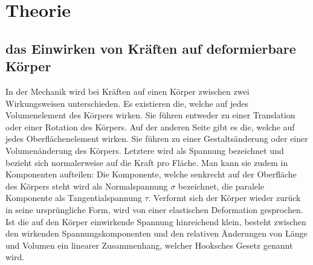 
\section{Theorie}
\label{sec:Theorie}

\subsection{das Einwirken von Kräften auf deformierbare Körper}
In der Mechanik wird bei Kräften auf einen Körper zwischen zwei Wirkungsweisen unterschieden.
 Es existieren die, welche auf jedes Volumenelement des Körpers wirken. Sie
  führen entweder zu einer Translation oder einer Rotation des Körpers. Auf
   der anderen Seite gibt es die, welche auf jedes Oberflächenelement wirken.
    Sie führen zu einer Gestaltsänderung oder einer Volumenänderung des Körpers.
    Letztere wird als Spannung bezeichnet und bezieht sich normalerweise
     auf die Kraft pro Fläche. Man kann sie zudem in Komponenten aufteilen:
     Die Komponente, welche senkrecht auf der Oberfläche des Körpers steht
      wird als Normalspannung $\sigma$ bezeichnet,
       die paralele Komponente als Tangentialspannung $\tau$.
       Verformt sich der Körper wieder zurück in seine ursprüngliche Form,
        wird von einer elastischen Deformation gesprochen.
        Ist die auf den Körper einwirkende Spannung hinreichend klein,
         besteht zwischen den wirkenden Spannungskomponenten
          und den relativen Änderungen von Länge und Volumen ein linearer
           Zusammenhang, welcher Hooksches Gesetz genannt wird.



